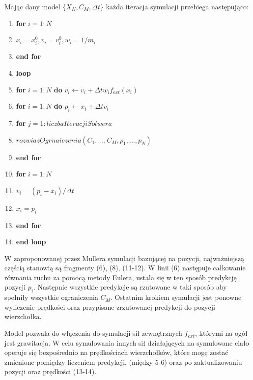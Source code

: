 Mając dany model $\{X_N, C_M, \Delta t \} $ każda iteracja symulacji przebiega
następująco:
\begin{enumerate}
\item \textbf{for} $i = 1:N$
\item \hspace{1cm} $x_i = x_i^0, v_i = v_i^0, w_i = 1/m_i$
\item \textbf{end for}
\item \textbf{loop}
\item \hspace{1cm} \textbf{for} $i = 1:N$ \textbf{do} $v_i \leftarrow v_i + \Delta t w_i f_{ext}(x_i)$
\item \hspace{1cm} \textbf{for} $i = 1:N$ \textbf{do} $p_i \leftarrow x_i + \Delta t v_i$
\item \hspace{1cm} \textbf{for} $j = 1:liczbaIteracjiSolwera$
\item \hspace{2cm} $rozwiazOgrnaiczenia(C_1,..., C_{M}, p_1, ..., p_N)$
\item \hspace{1cm} \textbf{end for}
\item \hspace{1cm} \textbf{for} $i = 1:N$
\item \hspace{2cm} $v_i = (p_i - x_i) / \Delta t$
\item \hspace{2cm} $x_i = p_i$
\item \hspace{1cm}\textbf{end for}
\item \textbf{end loop}

\end{enumerate}

W zaproponowanej przez Mullera symulacji bazującej na pozycji, najważniejszą częścią stanowią są
fragmenty (6), (8), (11-12). W linii (6) następuje całkowanie równania ruchu za 
pomocą metody Eulera, ustala się w ten sposób predykcję pozycji $p_i$. Następnie
wszystkie predykcje są rzutowane w taki sposób aby spełniły wszystkie
ograniczenia $C_M$. Ostatnim krokiem symulacji jest ponowne wyliczenie
prędkości oraz przypisane zrzutowanej predykcji do pozycji wierzchołka.

Model pozwala do włączenia do symulacji sił zewnętrznych $f_{ext}$, którymi na ogół jest
grawitacja. W celu symulowania innych sił działających na symulowane ciało
operuje się bezpośrednio na prędkościach wierzchołków, które mogę zostać
zmienione pomiędzy liczeniem predykcji, (między 5-6) oraz po
zaktualizowaniu pozycji oraz prędkości (13-14).

